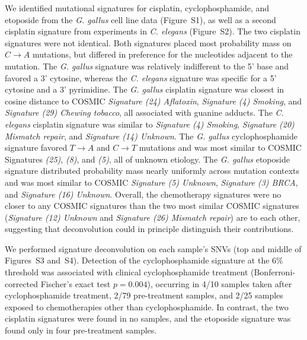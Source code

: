 \documentclass{bmcart}
\begin{document}
We identified mutational signatures for cisplatin, cyclophosphamide, and etoposide from the \textit{G. gallus} cell line data (Figure~S1), as well as a second cisplatin signature from experiments in \textit{C. elegans} (Figure~S2). The two cisplatin signatures were not identical. Both signatures placed most probability mass on $C \rightarrow A$ mutations, but differed in preference for the nucleotides adjacent to the mutation. The \textit{G. gallus} signature was relatively indifferent to the 5' base and favored a 3' cytosine, whereas the \textit{C. elegans} signature was specific for a 5' cytosine and a 3' pyrimidine. The \textit{G. gallus} cisplatin signature was closest in cosine distance to COSMIC \textit{Signature (24) Aflatoxin}, \textit{Signature (4) Smoking}, and \textit{Signature (29) Chewing tobacco}, all associated with guanine adducts. The \textit{C. elegans} cisplatin signature was similar to \textit{Signature (4) Smoking}, \textit{Signature (20) Mismatch repair}, and \textit{Signature (14) Unknown}. The \textit{G. gallus} cyclophosphamide signature favored $T \rightarrow A$ and $C \rightarrow T$ mutations and was most similar to COSMIC Signatures \textit{(25)}, \textit{(8)}, and \textit{(5)}, all of unknown etiology. The \textit{G. gallus} etoposide signature distributed probability mass nearly uniformly across mutation contexts and was most similar to COSMIC \textit{Signature (5) Unknown}, \textit{Signature (3) BRCA}, and \textit{Signature (16) Unknown}. Overall, the chemotherapy signatures were no closer to any COSMIC signatures than the two most similar COSMIC signatures (\textit{Signature (12) Unknown} and \textit{Signature (26) Mismatch repair}) are to each other, suggesting that deconvolution could in principle distinguish their contributions.

We performed signature deconvolution on each sample's SNVs (top and middle of Figures~S3 and~S4). Detection of the cyclophosphamide signature at the 6\% threshold was associated with clinical cyclophosphamide treatment (Bonferroni-corrected Fischer's exact test $p = 0.004$), occurring in 4/10 samples taken after cyclophosphamide treatment, 2/79 pre-treatment samples, and 2/25 samples exposed to chemotherapies other than cyclophosphamide. In contrast, the two cisplatin signatures were found in no samples, and the etoposide signature was found only in four pre-treatment samples.
\end{document}
